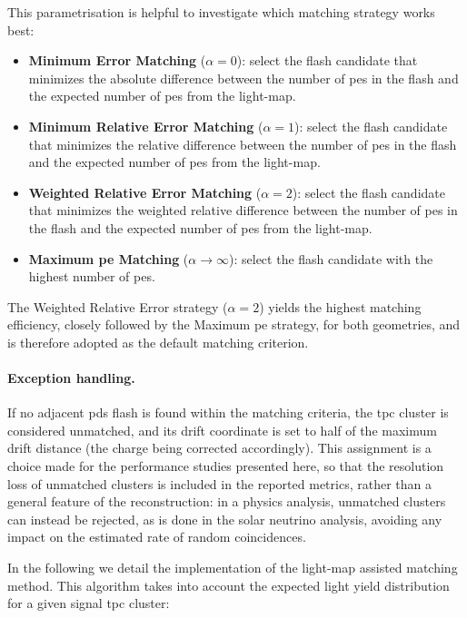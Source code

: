 This parametrisation is helpful to investigate which matching strategy works best:

\begin{itemize}
    \item \textbf{Minimum Error Matching} ($\alpha = 0$): select the flash candidate that minimizes the absolute difference between the number of \gls{pe}s in the flash and the expected number of \gls{pe}s from the light-map.
    \item \textbf{Minimum Relative Error Matching} ($\alpha = 1$): select the flash candidate that minimizes the relative difference between the number of \gls{pe}s in the flash and the expected number of \gls{pe}s from the light-map.
    \item \textbf{Weighted Relative Error Matching} ($\alpha = 2$): select the flash candidate that minimizes the weighted relative difference between the number of \gls{pe}s in the flash and the expected number of \gls{pe}s from the light-map.
    \item \textbf{Maximum \gls{pe} Matching} ($\alpha \to \infty$): select the flash candidate with the highest number of \gls{pe}s.
\end{itemize}

The Weighted Relative Error strategy ($\alpha = 2$) yields the highest matching efficiency, closely followed by the Maximum \gls{pe} strategy, for both geometries, and is therefore adopted as the default matching criterion.

\paragraph{Exception handling.} If no adjacent \gls{pds} flash is found within the matching criteria, the \gls{tpc} cluster is considered unmatched, and its drift coordinate is set to half of the maximum drift distance (the charge being corrected accordingly). This assignment is a choice made for the performance studies presented here, so that the resolution loss of unmatched clusters is included in the reported metrics, rather than a general feature of the reconstruction: in a physics analysis, unmatched clusters can instead be rejected, as is done in the solar neutrino analysis, avoiding any impact on the estimated rate of random coincidences.

In the following we detail the implementation of the light-map assisted matching method. This algorithm takes into account the expected light yield distribution for a given signal \gls{tpc} cluster:

